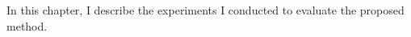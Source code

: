 \label{chapter:experiments}

In this chapter, I describe the experiments I conducted to evaluate
the proposed method.
